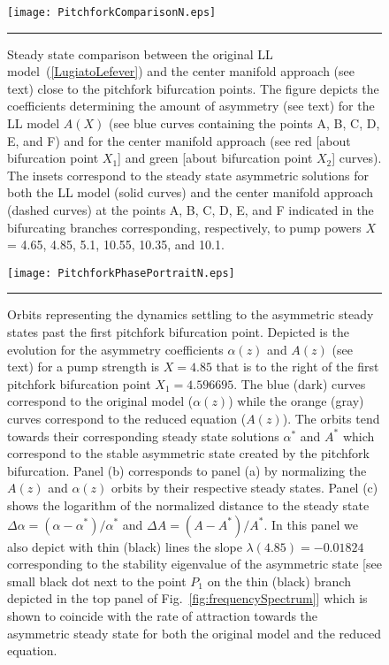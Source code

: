 \begin{figure*}[t!!]
\centering
\centerline{
\texttt{[image: PitchforkComparisonN.eps]}}
  \rule{35em}{0.5pt}
\caption[LL Model and Center Manifold Approach Steady State Comparison near Pitchfork Bifurcation Points]{
Steady state comparison between the original LL model~(\ref{LugiatoLefever})
and the center manifold approach (see text) close to the pitchfork bifurcation
points.
%
The figure depicts the coefficients determining the amount of asymmetry 
(see text) for the LL model $A(X)$ (see blue curves containing
the points A, B, C, D, E, and F) and for the center manifold approach
(see red [about bifurcation point $X_1$] and green
[about bifurcation point $X_2$] curves).
%
The insets correspond to the steady state asymmetric solutions for
both the LL model (solid curves) and the center manifold approach
(dashed curves) at the points A, B, C, D, E, and F indicated in
the bifurcating branches corresponding, respectively, to pump powers 
$X$ = 4.65, 4.85, 5.1, 10.55, 10.35, and 10.1.}
\label{PirchforkBifurcationComparison}
\end{figure*}
%
\begin{figure}[htb!]
\centering
\centerline{
\texttt{[image: PitchforkPhasePortraitN.eps]}}
  \rule{35em}{0.5pt}
\caption[LL Model and Center Manifold Reduction Pitchfork Bifurcation Orbits]{Orbits representing the dynamics settling to the
asymmetric steady states past the first pitchfork bifurcation point.
%
Depicted is the evolution for the asymmetry coefficients 
$\alpha(z)$ and $A(z)$ (see text) for a 
pump strength is $X=4.85$ that is to the right of the
first pitchfork bifurcation point $X_1=4.596695$.
%
The blue (dark) curves correspond to the original model
($\alpha(z)$)  while the orange (gray) curves correspond to the 
reduced equation ($A(z)$).
%
The orbits tend towards their corresponding steady state solutions
$\alpha^*$ and $A^*$ which correspond to the stable asymmetric
state created by the pitchfork bifurcation.
%
Panel (b) corresponds to panel (a) by normalizing the $A(z)$
and $\alpha(z)$ orbits by their respective steady states.
%
Panel (c) shows the logarithm of the normalized distance to the
steady state $\Delta \alpha=(\alpha-\alpha^*)/\alpha^*$ 
and $\Delta A=(A-A^*)/A^*$.
%
In this panel we also depict with thin (black) lines the slope 
$\lambda(4.85)=-0.01824$ corresponding 
to the stability eigenvalue of the asymmetric state [see
small black dot next to the point $P_1$ on the thin (black) 
branch depicted in the top panel of Fig.~\ref{fig:frequencySpectrum}]
which is shown to coincide with the rate of attraction towards
the asymmetric steady state for both the original model and the reduced equation.
}
\label{PitchPhasePortrait}
\end{figure}

